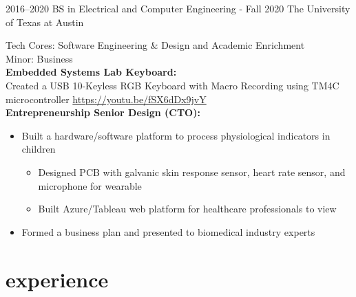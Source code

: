 \documentclass[]{friggeri-cv} %
\begin{document}
\begin{entrylist}

	\entry
	{2016--2020}
	{BS in Electrical and Computer Engineering - Fall 2020}
	{The University of Texas at Austin}
	{
		Tech Cores: Software Engineering \& Design and Academic Enrichment \\ 
		Minor: Business \\
		\textbf{Embedded Systems Lab Keyboard:} \\ 
			Created a USB 10-Keyless RGB Keyboard with Macro Recording using TM4C microcontroller \href{https://youtu.be/fSX6dDx9jvY}{https://youtu.be/fSX6dDx9jvY} \\
		\textbf{Entrepreneurship Senior Design (CTO):} 
		\begin{itemize}
			\item Built a hardware/software platform to process physiological indicators in children
			\begin{itemize}
				\item Designed PCB with galvanic skin response sensor, heart rate sensor, and microphone for wearable
				\item Built Azure/Tableau web platform for healthcare professionals to view
			\end{itemize}
			\item Formed a business plan and presented to biomedical industry experts 
		\end{itemize}
	}
	
\end{entrylist}


\vspace{-15pt}
\section{experience}
\vspace{-10pt}
\end{document}
